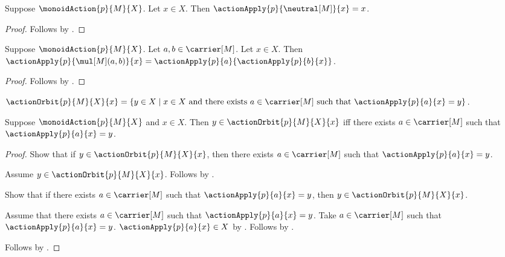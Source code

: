 \begin{proposition}\label{monoid_action_neutral}
    Suppose $\monoidAction{p}{M}{X}$.
    Let $x\in X$.
    Then $\actionApply{p}{\neutral[M]}{x}=x$.
\end{proposition}
\begin{proof}
    Follows by .
\end{proof}

\begin{proposition}\label{monoid_action_mul}
    Suppose $\monoidAction{p}{M}{X}$.
    Let $a,b\in\carrier[M]$.
    Let $x\in X$.
    Then
        $\actionApply{p}{\mul[M](a,b)}{x}=
            \actionApply{p}{a}{\actionApply{p}{b}{x}}$.
\end{proposition}
\begin{proof}
    Follows by .
\end{proof}

\begin{definition}\label{action_orbit}
    $\actionOrbit{p}{M}{X}{x}=
        \{y\in X\mid\text{$x\in X$ and there exists
            $a\in\carrier[M]$ such that
            $\actionApply{p}{a}{x}=y$}\}$.
\end{definition}

\begin{proposition}\label{action_orbit_iff}
    Suppose $\monoidAction{p}{M}{X}$ and $x\in X$.
    Then $y\in\actionOrbit{p}{M}{X}{x}$ iff
        there exists $a\in\carrier[M]$ such that
            $\actionApply{p}{a}{x}=y$.
\end{proposition}
\begin{proof}
    Show that if $y\in\actionOrbit{p}{M}{X}{x}$, then
        there exists $a\in\carrier[M]$ such that
            $\actionApply{p}{a}{x}=y$.
    \begin{subproof}
        Assume $y\in\actionOrbit{p}{M}{X}{x}$.
        Follows by .
    \end{subproof}
    Show that if there exists $a\in\carrier[M]$ such that
        $\actionApply{p}{a}{x}=y$, then
        $y\in\actionOrbit{p}{M}{X}{x}$.
    \begin{subproof}
        Assume that there exists $a\in\carrier[M]$ such that
            $\actionApply{p}{a}{x}=y$.
        Take $a\in\carrier[M]$ such that
            $\actionApply{p}{a}{x}=y$.
        $\actionApply{p}{a}{x}\in X$ by
            .
        Follows by .
    \end{subproof}
    Follows by \auto.
\end{proof}

